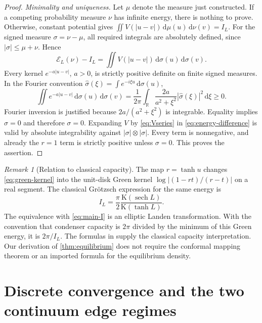 \documentclass[11pt,a4paper]{article}
\theoremstyle{definition}
\theoremstyle{remark}
\newtheorem{remark}[theorem]{Remark}
\newcommand{\R}{\mathbb R}
\newcommand{\dd}{\,\mathrm d}
\newcommand{\sech}{\operatorname{sech}}
\newcommand{\E}{\mathcal E}
\newcommand{\K}{\mathrm K}
\begin{document}
\begin{proof}
\emph{Minimality and uniqueness.}
Let $\mu$ denote the measure just constructed. If a competing probability
measure $\nu$ has infinite energy, there is nothing to prove. Otherwise,
constant potential gives
$\iint V(|u-v|)\dd\mu(u)\dd\nu(v)=I_L$. For the signed measure
$\sigma=\nu-\mu$, all required integrals are absolutely defined, since
$|\sigma|\le\mu+\nu$. Hence
\begin{equation}
 \E_L(\nu)-I_L=\iint V(|u-v|)\dd\sigma(u)\dd\sigma(v).
 \label{eq:energy-difference}
\end{equation}
Every kernel $e^{-a|u-v|}$, $a>0$, is strictly positive definite on finite
signed measures. In the Fourier convention
$\widehat\sigma(\xi)=\int e^{-i\xi u}\dd\sigma(u)$,
\begin{equation}
 \iint e^{-a|u-v|}\dd\sigma(u)\dd\sigma(v)
 =\frac1{2\pi}\int_\R\frac{2a}{a^2+\xi^2}
 |\widehat\sigma(\xi)|^2\dd\xi\ge0.
 \label{eq:positivekernel}
\end{equation}
Fourier inversion is justified because $2a/(a^2+\xi^2)$ is integrable.
Equality implies $\widehat\sigma=0$ and therefore $\sigma=0$.
Expanding $V$ by \eqref{eq:Vseries} in \eqref{eq:energy-difference} is valid
by absolute integrability against $|\sigma|\otimes|\sigma|$. Every term is
nonnegative, and already the $r=1$ term is strictly positive unless
$\sigma=0$. This proves the assertion.
\end{proof}

\begin{remark}[Relation to classical capacity]
The map $r=\tanh u$ changes \eqref{eq:green-kernel} into the unit-disk Green
kernel $\log|(1-rt)/(r-t)|$ on a real segment. The classical Gr\"otzsch
expression for the same energy is
\begin{equation}
 I_L=\frac\pi2\frac{\K(\sech L)}{\K(\tanh L)}.
 \label{eq:groetzsch}
\end{equation}
The equivalence with \eqref{eq:main-I} is an elliptic Landen transformation.
With the convention that condenser capacity is $2\pi$ divided by the
minimum of this Green energy, it is $2\pi/I_L$. The formulas in
\cite{nrv} supply the classical capacity interpretation. Our derivation
of \cref{thm:equilibrium} does not require the conformal mapping theorem or
an imported formula for the equilibrium density.
\end{remark}

\section{Discrete convergence and the two continuum edge regimes}
\label{sec:convergence}
\end{document}
